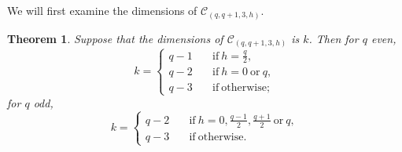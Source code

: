 \documentclass[10pt]{article}%
\newtheorem{theorem}{Theorem}%
\begin{document}
	We will first examine the dimensions of $\mathcal{C}_{(q,q+1,3,h)}$.
	\begin{theorem}\label{sec3 thm0}
		Suppose that the dimensions of $\mathcal{C}_{(q,q+1,3,h)}$ is $k$. Then for $q$ even,
		\begin{equation*}
			k=\left\{\begin{array}{ll}
				q-1\quad & \mathrm{if}\ h=\frac{q}{2},\\
				q-2\quad & \mathrm{if}\ h=0\ \mathrm{or}\ q,\\
				q-3\quad & \mathrm{if}\ \mathrm{otherwise};
			\end{array}\right.
		\end{equation*}
		for $q$ odd,
		\begin{equation*}
			k=\left\{\begin{array}{ll}
				q-2\quad & \mathrm{if}\ h=0,\frac{q-1}{2},\frac{q+1}{2}\ \mathrm{or}\ q,\\
				q-3\quad & \mathrm{if}\ \mathrm{otherwise}.
			\end{array}\right.
		\end{equation*}
	\end{theorem}
\end{document}
